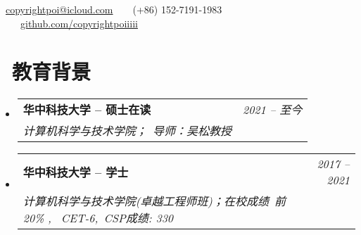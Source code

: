 \documentclass[utf8,letterpaper,11pt]{ctexart}
\makeatletter
\newcommand{\resumeSubheading}[4]{
  \vspace{-1pt}\item
    \begin{tabular*}{0.97\textwidth}[t]{l@{\extracolsep{\fill}}r}
      \textbf{#1} & \textit{#2} \\
      \textit{\small#3} & \textit{\small #4} \\
    \end{tabular*}\vspace{-5pt}
}
\newcommand{\resumeSubHeadingListStart}{\begin{itemize}[leftmargin=*]}
\newcommand{\resumeSubHeadingListEnd}{\end{itemize}}
\makeatother
\begin{document}




   \faEnvelope\ \href{mailto:copyrightpoi@icloud.com}{copyrightpoi@icloud.com}\ \ \ \faPhone\ (+86) 152-7191-1983 \ \ \ \faGithub\ \href{https://github.com/copyrightpoiiiii}{github.com/copyrightpoiiiii}
\vspace{1pt}
\section{\faGraduationCap \ 教育背景}
  \resumeSubHeadingListStart
    \resumeSubheading
      {华中科技大学 -- 硕士在读}{2021 -- 至今}
      {计算机科学与技术学院；\ 导师：吴松教授 }{}
    \resumeSubheading
      {华中科技大学 -- 学士}{2017 -- 2021}
      {计算机科学与技术学院(卓越工程师班)；\textit{在校成绩}\  前20\% , \ CET-6,\ CSP成绩: 330}{}
  \resumeSubHeadingListEnd 
\vspace{1pt}
\end{document}
